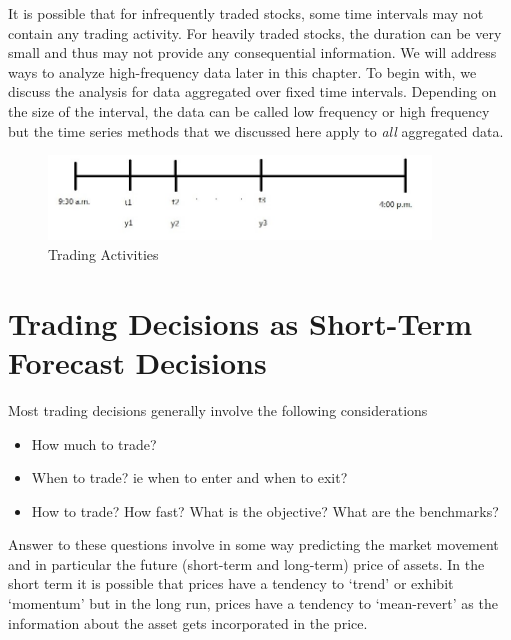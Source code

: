 It is possible that for infrequently traded stocks, some time intervals may not contain any trading activity. For heavily traded stocks, the duration can be very small and thus may not provide any consequential information. We will address ways to analyze high-frequency data later in this chapter. To begin with, we discuss the analysis for data aggregated over fixed time intervals. Depending on the size of the interval, the data can be called low frequency or high frequency but the time series methods that we discussed here apply to \textit{all} aggregated data.
	\begin{figure}[!ht]
	\includegraphics[width=4in]{chapters/chapter_uvts/figures/33d1.jpg}
	\caption{Trading Activities \label{fig:tradeactline}}
	\end{figure}


\section{Trading Decisions as Short-Term Forecast Decisions} 


Most trading decisions generally involve the following considerations
\begin{itemize}
\item How much to trade?
\item When to trade? ie when to enter and when to exit?
\item How to trade? How fast? What is the objective? What are the benchmarks?
\end{itemize}
Answer to these questions involve in some way predicting the market movement and in particular the future (short-term and long-term) price of assets. In the short term it is possible that prices have a tendency to `trend' or exhibit `momentum' but in the long run, prices have a tendency to `mean-revert' as the information about the asset gets incorporated in the price. 


